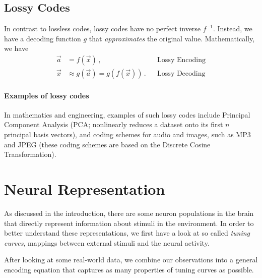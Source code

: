 \documentclass[10pt,letterpaper,oneside]{article}
\begin{document}
\subsection{Lossy Codes}

In contrast to lossless codes, lossy codes have no perfect inverse $f^{-1}$. Instead, we have a decoding function $g$ that \emph{approximates} the original value. Mathematically, we have
\begin{align*}
	\vec a &= f(\vec x) \,, && \text{Lossy Encoding} \\
	\vec x &\approx g(\vec a) = g(f(\vec x)) \,. && \text{Lossy Decoding} 
\end{align*}

\paragraph{Examples of lossy codes} In mathematics and engineering, examples of such lossy codes include Principal Component Analysis (PCA; nonlinearly reduces a dataset onto its first $n$ principal basis vectors), and coding schemes for audio and images, such as MP3 and JPEG (these coding schemes are based on the Discrete Cosine Transformation).


\section{Neural Representation}

As discussed in the introduction, there are some neuron populations in the brain that directly represent information about stimuli in the environment. In order to better understand these representations, we first have a look at so called \emph{tuning curves}, mappings between external stimuli and the neural activity.

After looking at some real-world data, we combine our observations into a general encoding equation that captures as many properties of tuning curves as possible.
\end{document}
